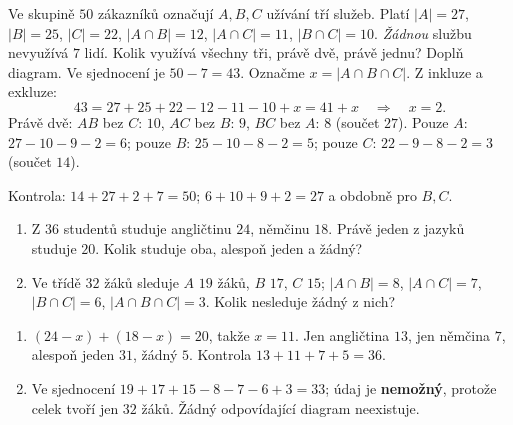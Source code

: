 \documentclass[11pt,a4paper]{article}
\begin{document}
\begin{prikladReseniBox}[title={Příklad 2}]
Ve skupině $50$ zákazníků označují $A,B,C$ užívání tří služeb.
Platí $|A|=27$, $|B|=25$, $|C|=22$,
$|A\cap B|=12$, $|A\cap C|=11$, $|B\cap C|=10$.
\emph{Žádnou} službu nevyužívá $7$ lidí. Kolik využívá všechny tři,
právě dvě, právě jednu? Doplň diagram.
\tcblower
Ve sjednocení je $50-7=43$. Označme $x=|A\cap B\cap C|$.
Z inkluze a exkluze:
\[
43=27+25+22-12-11-10+x=41+x\quad\Rightarrow\quad x=2.
\]
Právě dvě: $AB$ bez $C$: $10$, $AC$ bez $B$: $9$,
$BC$ bez $A$: $8$ (součet $27$).
Pouze $A$: $27-10-9-2=6$;
pouze $B$: $25-10-8-2=5$;
pouze $C$: $22-9-8-2=3$ (součet $14$).
\begin{center}
\end{center}
Kontrola: $14+27+2+7=50$;
$6+10+9+2=27$ a obdobně pro $B,C$.
\end{prikladReseniBox}

\begin{zadaniReseniBox}[title={Samostatná práce 2}]
\begin{enumerate}[label=\alph*)]
\item Z $36$ studentů studuje angličtinu $24$, němčinu $18$.
Právě jeden z jazyků studuje $20$. Kolik studuje oba, alespoň jeden a žádný?
\item Ve třídě $32$ žáků sleduje $A$ $19$ žáků, $B$ $17$, $C$ $15$;
$|A\cap B|=8$, $|A\cap C|=7$, $|B\cap C|=6$,
$|A\cap B\cap C|=3$. Kolik nesleduje žádný z nich?
\end{enumerate}
\tcblower
\begin{enumerate}[label=\alph*)]
\item $(24-x)+(18-x)=20$, takže $x=11$.
Jen angličtina $13$, jen němčina $7$, alespoň jeden $31$, žádný $5$.
Kontrola $13+11+7+5=36$.
\item Ve sjednocení $19+17+15-8-7-6+3=33$; údaj je \textbf{nemožný},
protože celek tvoří jen $32$ žáků. Žádný odpovídající diagram neexistuje.
\end{enumerate}
\end{zadaniReseniBox}
\end{document}
